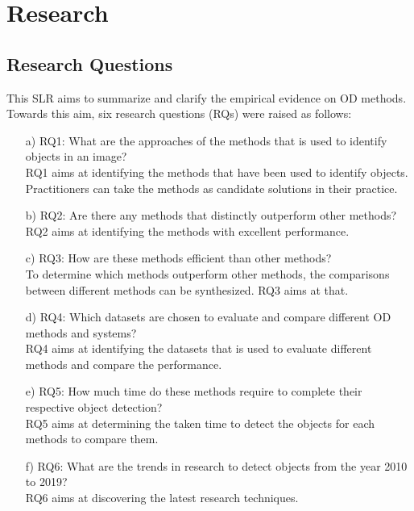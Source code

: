 \documentclass[two column]{ieeeaccess}
\begin{document}
\section{Research}

\subsection{Research Questions}
This SLR aims to summarize and clarify the empirical evidence on OD methods. Towards this aim, six research questions (RQs) were raised as follows:
\begin{itemize}

    \item[a)]RQ1: What are the approaches of the methods that is used to identify objects in an image?\\
    RQ1 aims at identifying the methods that have been used to identify objects. Practitioners can take the methods as candidate solutions in their practice.
    
    \item[b)]RQ2: Are there any methods that distinctly outperform other methods? \\
    RQ2 aims at identifying the methods with excellent performance. 
    
    \item[c)]RQ3: How are these methods efficient than other methods? \\
    To determine which methods outperform other methods, the comparisons between different methods can be synthesized. RQ3 aims at that.
    
    \item[d)]RQ4: Which datasets are chosen to evaluate and compare different OD methods and systems? \\
    RQ4 aims at identifying the datasets that is used to evaluate different methods and compare the performance.
    
    \item[e)]RQ5: How much time do these methods require to complete their respective object detection?\\
    RQ5 aims at determining the taken time to detect the objects for each methods to compare them.
    
    \item[f)]RQ6: What are the trends in research to detect objects from the year 2010 to 2019?\\
    RQ6 aims at discovering the latest research techniques.
    
\end{itemize}
\end{document}
